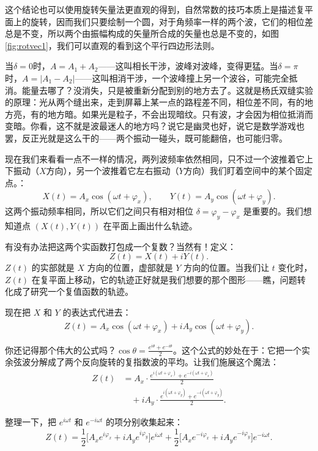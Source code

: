 \documentclass[UTF8]{ctexbook}
\begin{document}
这个结论也可以使用旋转矢量法更直观的得到，自然常数的技巧本质上是描述复平面上的旋转，因而我们只要绘制一个圆，对于角频率一样的两个波，它们的相位差总是不变，所以两个由振幅构成的矢量所合成的矢量也总是不变的，如图\ref{fig:rotvec1}，我们可以直观的看到这个平行四边形法则。

当$\delta=0$时，$A=A_1+A_2$——这叫相长干涉，波峰对波峰，变得更猛。当$\delta=\pi$时，$A=|A_1-A_2|$——这叫相消干涉，一个波峰撞上另一个波谷，可能完全抵消。能量去哪了？没消失，只是被重新分配到别的地方去了。这就是杨氏双缝实验的原理：光从两个缝出来，走到屏幕上某一点的路程差不同，相位差不同，有的地方亮，有的地方暗。如果光是粒子，不会出现暗纹。只有波，才会因为相位抵消而变暗。你看，这不就是波最迷人的地方吗？说它是幽灵也好，说它是数学游戏也罢，反正光就是这么干的——两个振动一碰头，既可能翻倍，也可能归零。







\bigskip

现在我们来看看一点不一样的情况，两列波频率依然相同，只不过一个波推着它上下振动（$X$方向），另一个波推着它左右振动（$Y$方向）我们盯着空间中的某个固定点。：
\[
X(t) = A_x \cos(\omega t + \varphi_x),\qquad Y(t) = A_y \cos(\omega t + \varphi_y).
\]
这两个振动频率相同，所以它们之间只有相对相位 $\delta = \varphi_y - \varphi_x$ 是重要的。我们想知道点 $(X(t),Y(t))$ 在平面上画出什么轨迹。

有没有办法把这两个实函数打包成一个复数？当然有！定义：
\[
Z(t) = X(t) + iY(t).
\]
$Z(t)$ 的实部就是 $X$ 方向的位置，虚部就是 $Y$ 方向的位置。当我们让 $t$ 变化时，$Z(t)$ 在复平面上移动，它的轨迹正好就是我们想要的那个图形——瞧，问题转化成了研究一个复值函数的轨迹。

现在把 $X$ 和 $Y$ 的表达式代进去：
\[
Z(t) = A_x \cos(\omega t + \varphi_x) + i A_y \cos(\omega t + \varphi_y).
\]

你还记得那个伟大的公式吗？$\cos\theta = \frac{e^{i\theta} + e^{-i\theta}}{2}$。这个公式的妙处在于：它把一个实余弦波分解成了两个反向旋转的复指数波的平均。让我们施展这个魔法：
\[
\begin{aligned}
Z(t) &= A_x \cdot \frac{e^{i(\omega t+\varphi_x)} + e^{-i(\omega t+\varphi_x)}}{2} \\
&\quad + i A_y \cdot \frac{e^{i(\omega t+\varphi_y)} + e^{-i(\omega t+\varphi_y)}}{2}.
\end{aligned}
\]

整理一下，把 $e^{i\omega t}$ 和 $e^{-i\omega t}$ 的项分别收集起来：
\[
Z(t) = \frac{1}{2}\Big[ A_x e^{i\varphi_x} + i A_y e^{i\varphi_y} \Big] e^{i\omega t}
     + \frac{1}{2}\Big[ A_x e^{-i\varphi_x} + i A_y e^{-i\varphi_y} \Big] e^{-i\omega t}.
\]
\end{document}
